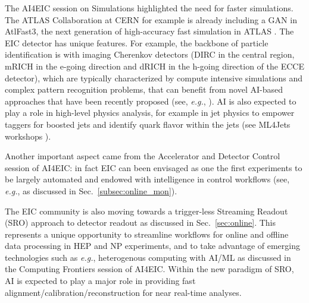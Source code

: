 
The AI4EIC session on Simulations highlighted the need for faster simulations. The ATLAS Collaboration at CERN for example is already including a GAN \cite{creswell2018generative} in AtlFast3, the next generation of high-accuracy fast simulation in ATLAS \cite{atlas2021atlfast3}. 
The EIC detector has unique features. For example, the backbone of particle identification is with imaging Cherenkov detectors \cite{he2020rich} (DIRC in the central region, mRICH in the e-going direction and dRICH in the h-going direction of the ECCE detector), which are typically characterized by compute intensive simulations and complex pattern recognition problems, that can benefit from novel AI-based approaches that have been recently proposed (see, \textit{e.g.}, \cite{fanelli2020deeprich}). %
%
%
%
 AI is also expected to play a role in high-level physics analysis, for example in jet physics to empower taggers for boosted jets and identify quark flavor within the jets (see ML4Jets workshops \cite{ml4jets}).    

Another important aspect came from the Accelerator and Detector Control session of AI4EIC: in fact EIC can been envisaged as one the first experiments to be largely automated and endowed with intelligence in control workflows (see, \textit{e.g.}, \cite{Hydra2021} as discussed in Sec.~\ref{subsec:online_mon}).  

The EIC community is also moving towards a trigger-less Streaming Readout (SRO) approach to detector readout as discussed in Sec.~\ref{sec:online}. 
This represents a unique opportunity to streamline workflows for online and offline data processing in HEP and NP experiments, and to take advantage of emerging technologies such as \textit{e.g.}, heterogenous computing with AI/ML as discussed in the Computing Frontiers session of AI4EIC.
Within the new paradigm of SRO, AI is expected to play a major role in providing fast alignment/calibration/reconstruction for near real-time analyses.









